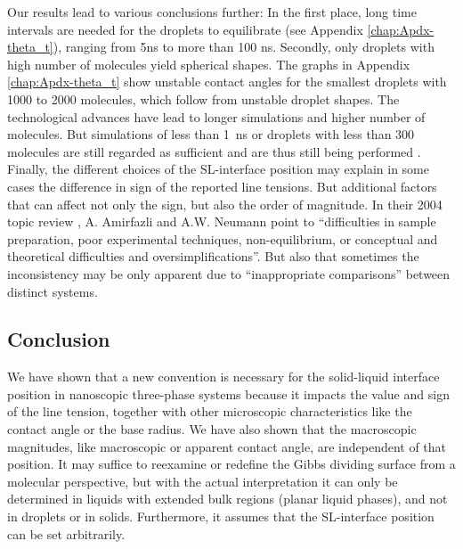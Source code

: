 Our results lead to various conclusions further: In the first place,
long time intervals are needed for the droplets to equilibrate (see
Appendix \ref{chap:Apdx-theta_t}), ranging from 5ns to more than
100 ns. Secondly, only droplets with high number of molecules yield
spherical shapes. The graphs in Appendix \ref{chap:Apdx-theta_t}
show unstable contact angles for the smallest droplets with 1000 to
2000 molecules, which follow from unstable droplet shapes. The technological
advances have lead to longer simulations and higher number of molecules.
But simulations of less than 1~ns or droplets with less than 300
molecules are still regarded as sufficient and are thus still being
performed \cite{giovambattista:2007,srivastava:2005}. Finally, the
different choices of the SL-interface position may explain in some
cases the difference in sign of the reported line tensions. But additional
factors that can affect not only the sign, but also the order of magnitude.
In their 2004 topic review \cite{amirfazli:2004}, A. Amirfazli and
A.W. Neumann point to ``difficulties in sample preparation, poor
experimental techniques, non-equilibrium, or conceptual and theoretical
difficulties and oversimplifications''. But also that sometimes the
inconsistency may be only apparent due to ``inappropriate comparisons''
between distinct systems.

\subsection{Conclusion}

We have shown that a new convention is necessary for the solid-liquid
interface position in nanoscopic three-phase systems because it impacts
the value and sign of the line tension, together with other microscopic
characteristics like the contact angle or the base radius. We have
also shown that the macroscopic magnitudes, like macroscopic or apparent
contact angle, are independent of that position. It may suffice to
reexamine or redefine the Gibbs dividing surface from a molecular
perspective, but with the actual interpretation it can only be determined
in liquids with extended bulk regions (planar liquid phases), and
not in droplets or in solids. Furthermore, it assumes that the SL-interface
position can be set arbitrarily.